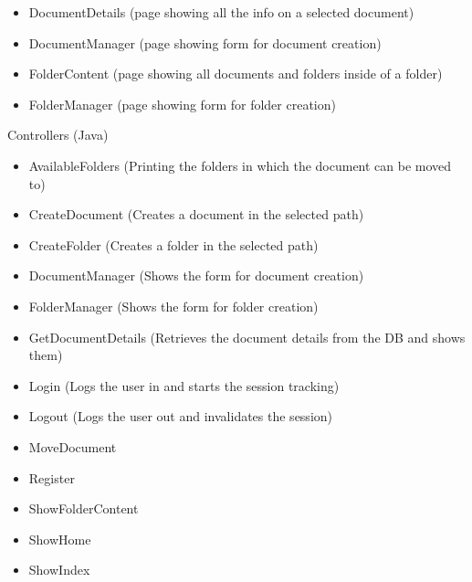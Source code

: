\documentclass[a4paper,12pt]{article}
\begin{document}
\begin{multicols}{2}
\begin{itemize}
	\item{DocumentDetails (page showing all the info on a selected document)}
	\item{DocumentManager (page showing form for document creation)}
	\item{FolderContent (page showing all documents and folders inside of a folder)}
	\item{FolderManager (page showing form for folder creation)}
\end{itemize}
Controllers (Java)
\begin{itemize}
	\item{AvailableFolders} (Printing the folders in which the document can be moved to)
	\item{CreateDocument} (Creates a document in the selected path)
	\item{CreateFolder} (Creates a folder in the selected path)
	\item{DocumentManager} (Shows the form for document creation)
	\item{FolderManager} (Shows the form for folder creation)
	\item{GetDocumentDetails} (Retrieves the document details from the DB and shows them)
	\item{Login} (Logs the user in and starts the session tracking)
	\item{Logout} (Logs the user out and invalidates the session)
	\item{MoveDocument} 
	\item{Register}
	\item{ShowFolderContent} 
	\item{ShowHome}
	\item{ShowIndex}
\end{itemize}
\end{multicols}
\newpage
\end{document}
